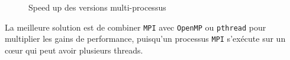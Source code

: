 \begin{figure}[H]
\centering
\caption{Speed up des versions multi-processus}
\label{fig:sp-proc}
\end{figure}

La meilleure solution est de combiner \texttt{MPI} avec \texttt{OpenMP} ou \texttt{pthread} pour multiplier les gains de performance, puisqu'un processus \texttt{MPI} s'exécute sur un c\oe ur qui peut avoir plusieurs threads.

